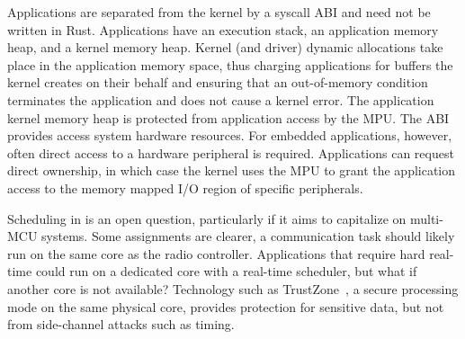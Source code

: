 Applications are separated from the kernel by a syscall ABI and need not be
written in Rust. Applications have an execution stack, an application memory
heap, and a kernel memory heap. Kernel (and driver) dynamic allocations take
place in the application memory space, thus charging applications for buffers
the kernel creates on their behalf and ensuring that an out-of-memory
condition terminates the application and does not cause a kernel error. The
application kernel memory heap is protected from application access by the
MPU.
%
The ABI provides access system hardware resources. For embedded applications,
however, often direct access to a hardware peripheral is required.
Applications can request direct ownership, in which case the kernel uses the
MPU to grant the application access to the memory mapped I/O region of
specific peripherals.

Scheduling in \name is an open question, particularly if it aims to capitalize
on multi-MCU systems. Some assignments are clearer, a communication task
should likely run on the same core as the radio controller. Applications
that require hard real-time could run on a dedicated core with a real-time
scheduler, but what if another core is not available? Technology such as
TrustZone~\cite{trustzone}, a secure processing mode on the same physical
core, provides protection for sensitive data, but not from side-channel
attacks such as timing.


% 

